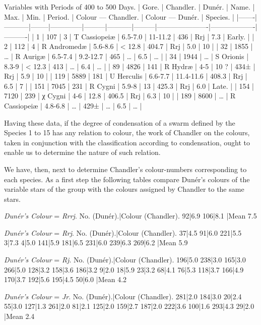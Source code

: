 \documentclass[a4paper, 12pt, oneside, polutonikogreek, english]{article}
\begin{document}
Variables with Periods of 400 to 500 Days. 
| Gore. | Chandler. | Dunér. | Name.    | Max.  | Min.   | Period. | Colour --- Chandler. | Colour --- Dunér. | Species. |
|-------|-----------|--------|--------------|---------|-----------|---------|----------------------|-------------------|----------|
| 1   | 107    | 3   | T Cassiopeiæ | 6.5-7.0 | 11-11.2  | 436   | Rrj         | 7.3        | Early.  |
| 2   | 112    | 4   | R Andromedæ | 5.6-8.6 | < 12.8  | 404.7  | Rrj         | 5.0        | 10    |
| 32  | 1855   | …   | R Aurigæ   | 6.5-7.4 | 9.2-12.7 | 465   | …          | 6.5        | …    |
| 34  | 1944   | …   | S Orionis  | 8.3-9  | < 12.3  | 413   | …          | 6.4        | …    |
| 89  | 4826   | 141  | R Hydræ   | 4-5   | 10 ?   | 434±  | Rrj         | 5.9        | 10    |
| 119  | 5889   | 181  | U Herculis  | 6.6-7.7 | 11.4-11.6 | 408.3  | Rrj         | 6.5        | 7    |
| 151  | 7045   | 231  | R Cygni   | 5.9-8  | 13    | 425.3  | Rrj         | 6.0        | Late.  |
| 154  | 7120   | 239  | χ Cygni   | 4-6   | 12.8   | 406.5  | Rrj         | 6.3        | 10    |
| 189  | 8600   | …   | R Cassiopeiæ | 4.8-6.8 | …     | 429±  | …          | 6.5        | …    |

Having these data, if the degree of condensation of a swarm defined by the Species 1 to 15 has any relation to colour, the work of Chandler on the colours, taken in conjunction with the classification according to condensation, ought to enable us to determine the nature of such relation.

We have, then, next to determine Chandler's colour-numbers corresponding to each species. As a first step the following tables compare Dunér's colours of the variable stars of the group with the colours assigned by Chandler to the same stars.

\emph{Dunér's Colour} = \emph{Rrrj}. 
No. (Dunér).|Colour (Chandler). 
92|6.9 
106|8.1 
|Mean 7.5 

\emph{Dunér's Colour} = \emph{Rrj}. 
No. (Dunér).|Colour (Chandler). 
37|4.5 
91|6.0 
221|5.5 
3|7.3 
4|5.0 
141|5.9 
181|6.5 
231|6.0 
239|6.3 
269|6.2 
|Mean 5.9 

\emph{Dunér's Colour} = \emph{Rj}. 
No. (Dunér).|Colour (Chandler). 
196|5.0 
238|3.0 
165|3.0 
266|5.0 
128|3.2 
158|3.6 
186|3.2 
9|2.0 
18|5.9 
23|3.2 
68|4.1 
76|5.3 
118|3.7 
166|4.9 
170|3.7 
192|5.6 
195|4.5 
50|6.0 
|Mean 4.2 

\emph{Dunér's Colour} = \emph{Jr}. 
No. (Dunér).|Colour (Chandler). 
281|2.0 
184|3.0 
20|2.4 
55|3.0 
127|1.3 
261|2.0 
81|2.1 
125|2.0 
159|2.7 
187|2.0 
222|3.6 
100|1.6 
293|4.3 
29|2.0 
|Mean 2.4 
\end{document}
